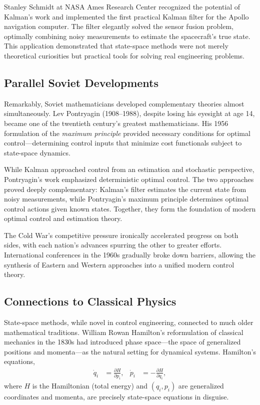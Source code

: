 Stanley Schmidt at NASA Ames Research Center recognized the potential of Kalman's work and implemented the first practical Kalman filter for the Apollo navigation computer. The filter elegantly solved the sensor fusion problem, optimally combining noisy measurements to estimate the spacecraft's true state. This application demonstrated that state-space methods were not merely theoretical curiosities but practical tools for solving real engineering problems.

\subsection{Parallel Soviet Developments}

Remarkably, Soviet mathematicians developed complementary theories almost simultaneously. Lev Pontryagin (1908--1988), despite losing his eyesight at age 14, became one of the twentieth century's greatest mathematicians. His 1956 formulation of the \textit{maximum principle} provided necessary conditions for optimal control---determining control inputs that minimize cost functionals subject to state-space dynamics.

While Kalman approached control from an estimation and stochastic perspective, Pontryagin's work emphasized deterministic optimal control. The two approaches proved deeply complementary: Kalman's filter estimates the current state from noisy measurements, while Pontryagin's maximum principle determines optimal control actions given known states. Together, they form the foundation of modern optimal control and estimation theory.

The Cold War's competitive pressure ironically accelerated progress on both sides, with each nation's advances spurring the other to greater efforts. International conferences in the 1960s gradually broke down barriers, allowing the synthesis of Eastern and Western approaches into a unified modern control theory.

\subsection{Connections to Classical Physics}

State-space methods, while novel in control engineering, connected to much older mathematical traditions. William Rowan Hamilton's reformulation of classical mechanics in the 1830s had introduced phase space---the space of generalized positions and momenta---as the natural setting for dynamical systems. Hamilton's equations,
\begin{align}
    \dot{q}_i &= \frac{\partial H}{\partial p_i}, & \dot{p}_i &= -\frac{\partial H}{\partial q_i},
\end{align}
where $H$ is the Hamiltonian (total energy) and $(q_i, p_i)$ are generalized coordinates and momenta, are precisely state-space equations in disguise.

